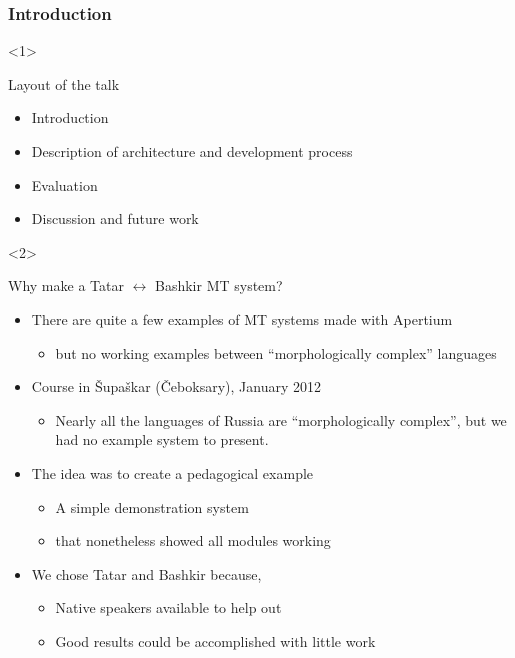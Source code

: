 \documentclass[10pt,xetex]{beamer} %
\begin{document}
\begin{frame}
  \frametitle{Introduction}
  
  \begin{onlyenv}<1>
    \begin{block}{Layout of the talk}
    
      \begin{itemize}
        \item Introduction
        \item Description of architecture and development process
        \item Evaluation
        \item Discussion and future work
      \end{itemize}
    
    \end{block}
  \end{onlyenv}
  
  \begin{onlyenv}<2>
    \begin{block}{Why make a Tatar $\leftrightarrow$ Bashkir MT system?}
    
      \begin{itemize}
        \item There are quite a few examples of MT systems made with Apertium
        \begin{itemize}
          \item but no working examples between ``morphologically complex'' languages
        \end{itemize}
    
        \item Course in Šupaškar (Čeboksary), January 2012
        \begin{itemize}
          \item Nearly all the languages of Russia are ``morphologically complex'', but
              we had no example system to present.
        \end{itemize} 
    
        \item The idea was to create a pedagogical example
        \begin{itemize}
          \item A simple demonstration system 
          \item that nonetheless showed all modules working
        \end{itemize}
     
        \item We chose Tatar and Bashkir because,
        \begin{itemize}
          \item Native speakers available to help out
          \item Good results could be accomplished with little work
        \end{itemize}
      \end{itemize}
    \end{block}
  \end{onlyenv}
  
\end{frame}
\end{document}
